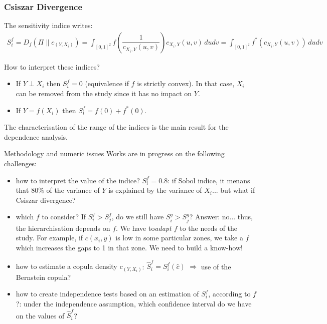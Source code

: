 \documentclass[8pt]{beamer}
\begin{document}
\begin{frame}
  \frametitle{Csiszar Divergence}
\small
The sensitivity indice writes:
    \begin{align*}
      S_i^f= D_f(\Pi \| c_{(Y,X_i)}) = \int_{[0,1]^2}f\left(\dfrac{1}{c_{X_i,Y}(u,v)}\right)c_{X_i,Y}(u,v)\,dudv=\int_{[0,1]^2}f^*\left(c_{X_i,Y}(u,v)\right)\,dudv
    \end{align*}

  \begin{block}{How to interpret these indices?}
  \begin{itemize}
   \item \alert{If $Y \perp X_i$ then $S_i^f=0$}  (equivalence if $f$ is strictly convex). In that case, $X_i$ can be removed from the study since it has no impact on  $Y$.
   \item \alert{If $Y=f(X_i)$ then $S_i^f = f(0) + f^*(0)$}.
  \end{itemize}
The characterisation of the range of the indices is the main result for the dependence analysis.
  \end{block}

  \begin{block}{Methodology and numeric issues}
   Works are in progress on the following challenges: 
    \begin{itemize}
    \item \alert{how to interpret the value of the indice?} $S_i^f=0.8$: if Sobol indice, it menans that $80\%$ of the variance of $Y$ is explained by the variance of $X_i$... but what if Csiszar divergence?
    \item \alert{which  $f$ to consider?} If $S_i^{f} > S_j^{f}$, do we still have $S_i^{g} > S_j^{g}$? Answer: no... thus, the hierarchisation depends on $f$. We have to\emph{adapt $f$} to the needs of the study. For example, if $c(x_i, y)$ is low in some particular zones, we take a $f$ which increases the gaps to 1 in that zone. We need to build a know-how!
      \item \alert{how to estimate a copula density $c_{(Y,X_i)}$}:  $\hat{S}_i^f = S_i^f(\hat{c})$ $\Longrightarrow$ use of the Bernstein copula?
     \item \alert{how to create independence tests} based on an estimation of $S_i^f$, according to $f$?: under the independence assumption, which confidence interval do we have on the values of $\hat{S}_i^f$?
    \end{itemize}

  \end{block}

\end{frame}
\end{document}
